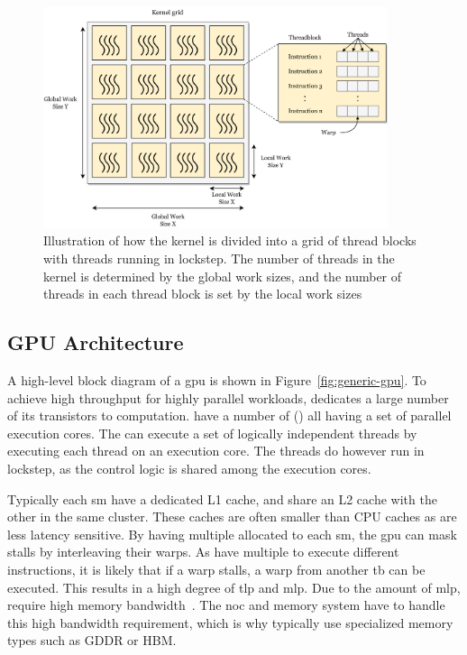 
\begin{figure}
    \centering
    \includegraphics[width=0.9\textwidth]{figures/grid.png}
    \caption[Relation between the kernel, thread blocks, threads and warps]{Illustration of how the kernel is divided into a grid of thread blocks with threads running in lockstep. The number of threads in the kernel is determined by the global work sizes, and the number of threads in each thread block is set by the local work sizes}
    \label{fig:kernel_work_items}
\end{figure} 

\subsection{GPU Architecture}

A high-level block diagram of a \acrshort{gpu} is shown in Figure~\ref{fig:generic-gpu}. To achieve high throughput for highly parallel workloads,  dedicates a large number of its transistors to computation.  have a number of \textit{}() all having a set of parallel execution cores. The  can execute a set of logically independent threads by executing each thread on an execution core. The threads do however run in lockstep, as the control logic is shared among the execution cores. 

Typically each \acrshort{sm} have a dedicated L1 cache, and share an L2 cache with the other  in the same cluster. These caches are often smaller than CPU caches as  are less latency sensitive. By having multiple  allocated to each \acrshort{sm}, the \acrshort{gpu} can mask stalls by interleaving their warps. As  have multiple  to execute different instructions, it is likely that if a warp stalls, a warp from another \acrshort{tb} can be executed. This results in a high degree of \acrfull{tlp} and \acrfull{mlp}. Due to the amount of \acrshort{mlp},  require high memory bandwidth~\cite{get_out_of_the_valley}. The \acrshort{noc} and memory system have to handle this high bandwidth requirement, which is why  typically use specialized memory types such as GDDR or HBM. 

